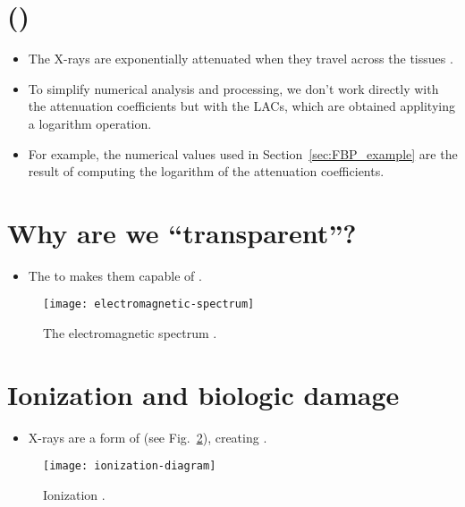 \section{ ()}
\begin{itemize}
\item The X-rays are
  exponentially attenuated when they travel across the tissues \cite{wikipedia_LAC}.
\item To simplify numerical analysis and processing, we don't work
  directly with the attenuation coefficients but with the \glspl{LAC}, which
  are obtained applitying a logarithm operation.
\item For example, the numerical values used in
  Section~\ref{sec:FBP_example} are the result of computing the
  logarithm of the 
  attenuation coefficients.
\end{itemize}

\section{Why are we ``transparent''?}
\begin{itemize}
\item The  to  makes them capable of .
\end{itemize}
\vspace{-1ex}
\begin{figure}[!h]
  \centering
  \texttt{[image: electromagnetic-spectrum]}
  \caption{The electromagnetic spectrum
    \cite{X-rays_in_spectrum}.\label{fig:X-rays_in_spectrum}}
\end{figure}

\section{Ionization and biologic damage}
\begin{itemize}
\item X-rays are a form of  (see Fig.~\ref{fig:ionization}), creating
  .
\end{itemize}
\vspace{-1ex}
\begin{figure}[!h]
  \centering
  \texttt{[image: ionization-diagram]}
  \caption{Ionization
    \cite{Perakende_ionization}.\label{fig:ionization}}
\end{figure}

